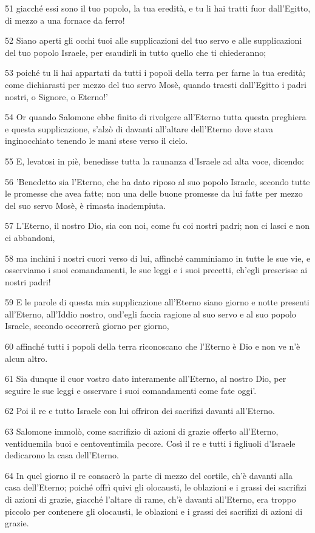 \par 51 giacché essi sono il tuo popolo, la tua eredità, e tu li hai tratti fuor dall'Egitto, di mezzo a una fornace da ferro!
\par 52 Siano aperti gli occhi tuoi alle supplicazioni del tuo servo e alle supplicazioni del tuo popolo Israele, per esaudirli in tutto quello che ti chiederanno;
\par 53 poiché tu li hai appartati da tutti i popoli della terra per farne la tua eredità; come dichiarasti per mezzo del tuo servo Mosè, quando traesti dall'Egitto i padri nostri, o Signore, o Eterno!'
\par 54 Or quando Salomone ebbe finito di rivolgere all'Eterno tutta questa preghiera e questa supplicazione, s'alzò di davanti all'altare dell'Eterno dove stava inginocchiato tenendo le mani stese verso il cielo.
\par 55 E, levatosi in piè, benedisse tutta la raunanza d'Israele ad alta voce, dicendo:
\par 56 'Benedetto sia l'Eterno, che ha dato riposo al suo popolo Israele, secondo tutte le promesse che avea fatte; non una delle buone promesse da lui fatte per mezzo del suo servo Mosè, è rimasta inadempiuta.
\par 57 L'Eterno, il nostro Dio, sia con noi, come fu coi nostri padri; non ci lasci e non ci abbandoni,
\par 58 ma inchini i nostri cuori verso di lui, affinché camminiamo in tutte le sue vie, e osserviamo i suoi comandamenti, le sue leggi e i suoi precetti, ch'egli prescrisse ai nostri padri!
\par 59 E le parole di questa mia supplicazione all'Eterno siano giorno e notte presenti all'Eterno, all'Iddio nostro, ond'egli faccia ragione al suo servo e al suo popolo Israele, secondo occorrerà giorno per giorno,
\par 60 affinché tutti i popoli della terra riconoscano che l'Eterno è Dio e non ve n'è alcun altro.
\par 61 Sia dunque il cuor vostro dato interamente all'Eterno, al nostro Dio, per seguire le sue leggi e osservare i suoi comandamenti come fate oggi'.
\par 62 Poi il re e tutto Israele con lui offriron dei sacrifizi davanti all'Eterno.
\par 63 Salomone immolò, come sacrifizio di azioni di grazie offerto all'Eterno, ventiduemila buoi e centoventimila pecore. Così il re e tutti i figliuoli d'Israele dedicarono la casa dell'Eterno.
\par 64 In quel giorno il re consacrò la parte di mezzo del cortile, ch'è davanti alla casa dell'Eterno; poiché offrì quivi gli olocausti, le oblazioni e i grassi dei sacrifizi di azioni di grazie, giacché l'altare di rame, ch'è davanti all'Eterno, era troppo piccolo per contenere gli olocausti, le oblazioni e i grassi dei sacrifizi di azioni di grazie.
